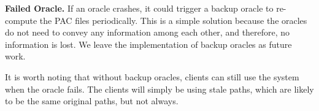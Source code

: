 {\bf Failed Oracle.} If an oracle crashes, it could trigger a backup oracle 
to re-compute the PAC files periodically.  This is a simple solution because 
the oracles do not need to convey any information among each other, and therefore, 
no information is lost.  We leave the implementation of backup oracles as future 
work.

It is worth noting that without backup oracles, clients can still use the system 
when the oracle fails.  The clients will simply be using stale paths, which are 
likely to be the same original paths, but not always.  


